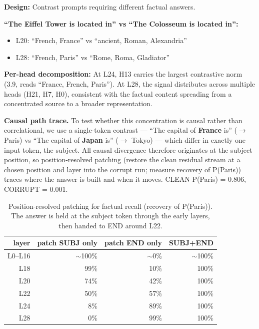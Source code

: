 \documentclass[11pt]{article}
\begin{document}
\textbf{Design:} Contrast prompts requiring different factual answers.

\textbf{``The Eiffel Tower is located in'' vs ``The Colosseum is located in'':}
\begin{itemize}[leftmargin=*]
\item L20: ``French, France'' vs ``ancient, Roman, Alexandria''
\item L28: ``French, Paris'' vs ``Rome, Roma, Gladiator''
\end{itemize}

\textbf{Per-head decomposition:} At L24, H13 carries the largest contrastive norm
(3.9, reads ``France, French, Paris''). At L28, the signal distributes across
multiple heads (H21, H7, H0), consistent with the factual content spreading
from a concentrated source to a broader representation.

\textbf{Causal path trace.} To test whether this concentration is causal rather than
correlational, we use a single-token contrast --- ``The capital of \textbf{France} is''
($\rightarrow$ Paris) vs ``The capital of \textbf{Japan} is'' ($\rightarrow$ Tokyo) --- which differ in exactly
one input token, the subject. All causal divergence therefore originates at the
subject position, so position-resolved patching (restore the clean residual
stream at a chosen position and layer into the corrupt run; measure recovery of
P(Paris)) traces where the answer is built and when it moves. CLEAN P(Paris) =
0.806, CORRUPT = 0.001.

\begin{table}[htbp]
\centering
\small
\begin{tabular}{rrrr}
\toprule
layer & patch SUBJ only & patch END only & SUBJ+END \\
\midrule
L0--L16 & $\sim$100\% & $\sim$0\% & $\sim$100\% \\
L18 & 99\% & 10\% & 100\% \\
L20 & 74\% & 42\% & 100\% \\
L22 & 50\% & 57\% & 100\% \\
L24 & 8\% & 89\% & 100\% \\
L28 & 0\% & 99\% & 100\% \\
\bottomrule
\end{tabular}
\caption{Position-resolved patching for factual recall (recovery of P(Paris)). The answer is held at the subject token through the early layers, then handed to END around L22.}
\label{tab:fact-path}
\end{table}
\end{document}
